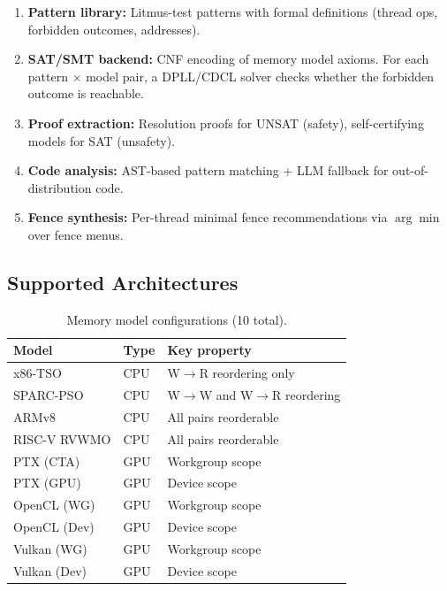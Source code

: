 \documentclass[11pt]{article}
\begin{document}
\begin{enumerate}[nosep]
\item \textbf{Pattern library:} Litmus-test patterns with formal
  definitions (thread ops, forbidden outcomes, addresses).
\item \textbf{SAT/SMT backend:} CNF encoding of memory model axioms.
  For each pattern $\times$ model pair, a DPLL/CDCL solver checks
  whether the forbidden outcome is reachable.
\item \textbf{Proof extraction:} Resolution proofs for UNSAT
  (safety), self-certifying models for SAT (unsafety).
\item \textbf{Code analysis:} AST-based pattern matching + LLM
  fallback for out-of-distribution code.
\item \textbf{Fence synthesis:} Per-thread minimal fence
  recommendations via $\arg\min$ over fence menus.
\end{enumerate}

\subsection{Supported Architectures}

\begin{table}[ht]
\centering
\caption{Memory model configurations (10 total).}
\label{tab:archs}
\small
\begin{tabular}{lll}
\toprule
\textbf{Model} & \textbf{Type} & \textbf{Key property} \\
\midrule
x86-TSO & CPU & W$\to$R reordering only \\
SPARC-PSO & CPU & W$\to$W and W$\to$R reordering \\
ARMv8 & CPU & All pairs reorderable \\
RISC-V RVWMO & CPU & All pairs reorderable \\
PTX (CTA) & GPU & Workgroup scope \\
PTX (GPU) & GPU & Device scope \\
OpenCL (WG) & GPU & Workgroup scope \\
OpenCL (Dev) & GPU & Device scope \\
Vulkan (WG) & GPU & Workgroup scope \\
Vulkan (Dev) & GPU & Device scope \\
\bottomrule
\end{tabular}
\end{table}

\end{document}
